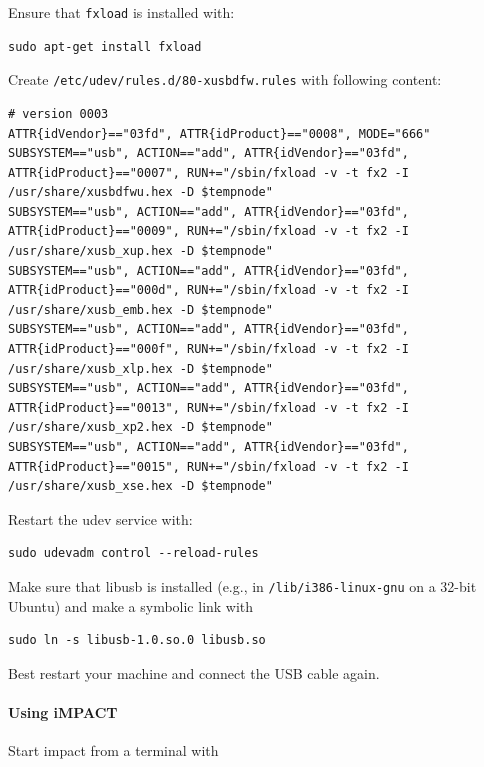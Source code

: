 \documentclass[a4paper,fontsize=10pt,twoside,DIV15,BCOR12mm,headinclude=true,footinclude=false,pagesize,bibtotoc]{scrbook}
\newcommand{\code}[1]{{\texttt{#1}}}
\begin{document}
Ensure that \code{fxload} is installed with:
\begin{verbatim} 
sudo apt-get install fxload
\end{verbatim}

Create \code{/etc/udev/rules.d/80-xusbdfw.rules} with following content:

\begin{tiny}
\begin{verbatim}
# version 0003
ATTR{idVendor}=="03fd", ATTR{idProduct}=="0008", MODE="666"
SUBSYSTEM=="usb", ACTION=="add", ATTR{idVendor}=="03fd", ATTR{idProduct}=="0007", RUN+="/sbin/fxload -v -t fx2 -I /usr/share/xusbdfwu.hex -D $tempnode"
SUBSYSTEM=="usb", ACTION=="add", ATTR{idVendor}=="03fd", ATTR{idProduct}=="0009", RUN+="/sbin/fxload -v -t fx2 -I /usr/share/xusb_xup.hex -D $tempnode"
SUBSYSTEM=="usb", ACTION=="add", ATTR{idVendor}=="03fd", ATTR{idProduct}=="000d", RUN+="/sbin/fxload -v -t fx2 -I /usr/share/xusb_emb.hex -D $tempnode"
SUBSYSTEM=="usb", ACTION=="add", ATTR{idVendor}=="03fd", ATTR{idProduct}=="000f", RUN+="/sbin/fxload -v -t fx2 -I /usr/share/xusb_xlp.hex -D $tempnode"
SUBSYSTEM=="usb", ACTION=="add", ATTR{idVendor}=="03fd", ATTR{idProduct}=="0013", RUN+="/sbin/fxload -v -t fx2 -I /usr/share/xusb_xp2.hex -D $tempnode"
SUBSYSTEM=="usb", ACTION=="add", ATTR{idVendor}=="03fd", ATTR{idProduct}=="0015", RUN+="/sbin/fxload -v -t fx2 -I /usr/share/xusb_xse.hex -D $tempnode"
\end{verbatim}
\end{tiny}

Restart the udev service with:

\begin{verbatim} 
sudo udevadm control --reload-rules
\end{verbatim}

Make sure that libusb is installed (e.g., in \code{/lib/i386-linux-gnu} on a 32-bit Ubuntu) and make a symbolic link with

\begin{verbatim} 
sudo ln -s libusb-1.0.so.0 libusb.so
\end{verbatim}

Best restart your machine and connect the USB cable again.

\paragraph{Using iMPACT}

Start impact from a terminal with 
\end{document}

